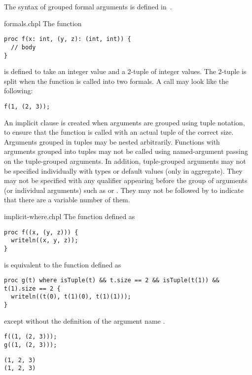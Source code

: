 The syntax of grouped formal arguments is defined
in~.

\begin{chapelexample}{formals.chpl}
The function
\begin{chapel}
\begin{verbatim}
proc f(x: int, (y, z): (int, int)) {
  // body
}
\end{verbatim}
\end{chapel}
is defined to take an integer value and a 2-tuple of integer values.
The 2-tuple is split when the function is called into two formals.  A
call may look like the following:
\begin{chapel}
\begin{verbatim}
f(1, (2, 3));
\end{verbatim}
\end{chapel}
\end{chapelexample}

An implicit  clause is created when arguments are grouped using
tuple notation, to ensure that the function is called with an actual
tuple of the correct size.  Arguments grouped in tuples may be
nested arbitrarily.  Functions with arguments grouped into tuples may not be
called using named-argument passing on the tuple-grouped arguments.
In addition, tuple-grouped arguments may not be specified individually
with types or default values (only in aggregate).  They may not be
specified with any qualifier appearing before the group of arguments
(or individual arguments) such as  or .  They
may not be followed by  to indicate that there are a
variable number of them.

\begin{chapelexample}{implicit-where.chpl}
The function  defined as
\begin{chapel}
\begin{verbatim}
proc f((x, (y, z))) {
  writeln((x, y, z));
}
\end{verbatim}
\end{chapel}
is equivalent to the function  defined as
\begin{chapel}
\begin{verbatim}
proc g(t) where isTuple(t) && t.size == 2 && isTuple(t(1)) && t(1).size == 2 {
  writeln((t(0), t(1)(0), t(1)(1)));
}
\end{verbatim}
\end{chapel}
except without the definition of the argument name .
\begin{chapelpost}
\begin{verbatim}
f((1, (2, 3)));
g((1, (2, 3)));
\end{verbatim}
\end{chapelpost}
\begin{chapeloutput}
\begin{verbatim}
(1, 2, 3)
(1, 2, 3)
\end{verbatim}
\end{chapeloutput}
\end{chapelexample}

